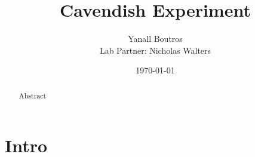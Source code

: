 \documentclass{article}
\begin{document}
\title{Cavendish Experiment}
\author{Yanall Boutros \\ Lab Partner: Nicholas Walters}
\date{\today}
\maketitle
\begin{abstract}
Abstract
\end{abstract}
\section{Intro}
\end{document}
